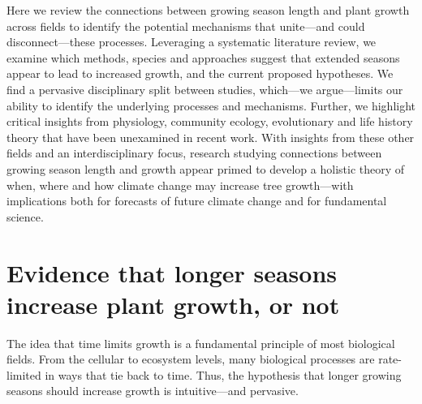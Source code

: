 \documentclass[11pt]{article}
\begin{document}
Here we review the connections between growing season length and plant growth across fields to identify the potential mechanisms that unite---and could disconnect---these processes. %
Leveraging a systematic literature review, we examine which methods, species and approaches suggest that extended seasons appear to lead to increased growth, and the current proposed hypotheses. We find a pervasive disciplinary split between studies, which---we argue---limits our ability to identify the underlying processes and mechanisms. Further, we highlight critical insights from physiology, community ecology, evolutionary and life history theory that have been unexamined in recent work. With insights from these other fields and an interdisciplinary focus, research studying connections between growing season length and growth appear primed to develop a holistic theory of when, where and how climate change may increase tree growth---with implications both for forecasts of future climate change and for fundamental science.

\section*{Evidence that longer seasons increase plant growth, or not}
The idea that time limits growth is a fundamental principle of most biological fields. From the cellular to ecosystem levels, many biological processes are rate-limited in ways that tie back to time. Thus, the hypothesis that longer growing seasons should increase growth is intuitive---and pervasive. 
\end{document}
